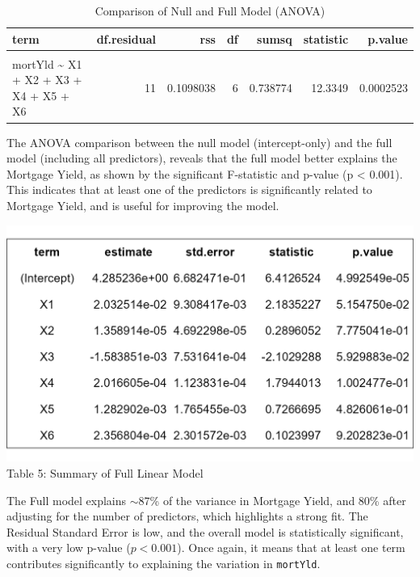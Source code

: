 \documentclass[
  11pt,
]{article}
\begin{document}
\begingroup\fontsize{8}{10}\selectfont

\begin{longtable}[t]{lrrrrrr}
\caption{\label{tab:unnamed-chunk-5}Comparison of Null and Full Model (ANOVA)}\\
\toprule
term & df.residual & rss & df & sumsq & statistic & p.value\\
\midrule
\cellcolor{gray!10}{mortYld \textasciitilde{} 1} & \cellcolor{gray!10}{17} & \cellcolor{gray!10}{0.8485778} & \cellcolor{gray!10}{NA} & \cellcolor{gray!10}{NA} & \cellcolor{gray!10}{NA} & \cellcolor{gray!10}{NA}\\
mortYld \textasciitilde{} X1 + X2 + X3 + X4 + X5 + X6 & 11 & 0.1098038 & 6 & 0.738774 & 12.3349 & 0.0002523\\
\bottomrule
\end{longtable}
\endgroup{}

The ANOVA comparison between the null model (intercept-only) and the
full model (including all predictors), reveals that the full model
better explains the Mortgage Yield, as shown by the significant
F-statistic and p-value (p \textless{} 0.001). This indicates that at
least one of the predictors is significantly related to Mortgage Yield,
and is useful for improving the model.

\begin{minipage}{0.42\textwidth}
\includegraphics[width=1.2\linewidth]{full_model_summary_table.png}
\vspace{-0.2em}
\small Table 5: Summary of Full Linear Model
\end{minipage}
\hfill
\begin{minipage}{0.45\textwidth}
\small
The Full model explains $\sim$87\% of the variance in Mortgage Yield, and 80\% after adjusting for the number of predictors, which highlights a strong fit. The Residual Standard Error is low, and the overall model is statistically significant, with a very low p-value ($p < 0.001$). Once again, it means that at least one term contributes significantly to explaining the variation in \texttt{mortYld}.
\end{minipage}
\end{document}
